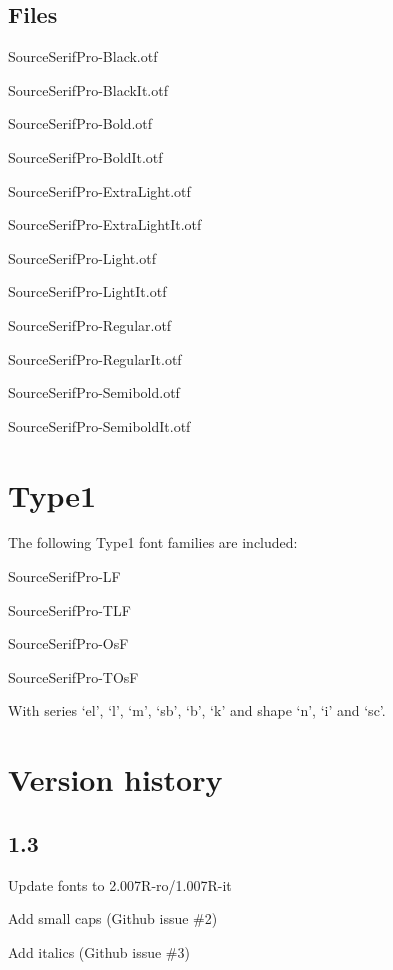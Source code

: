 \documentclass[10pt,a4paper,english]{article}
\begin{document}
\begin{multicols}{2}
\subsection{Files}
\begin{itemize*}
	\item SourceSerifPro-Black.otf
	\item SourceSerifPro-BlackIt.otf
	\item SourceSerifPro-Bold.otf
	\item SourceSerifPro-BoldIt.otf
	\item SourceSerifPro-ExtraLight.otf
	\item SourceSerifPro-ExtraLightIt.otf
	\item SourceSerifPro-Light.otf
	\item SourceSerifPro-LightIt.otf
	\item SourceSerifPro-Regular.otf
	\item SourceSerifPro-RegularIt.otf
	\item SourceSerifPro-Semibold.otf
	\item SourceSerifPro-SemiboldIt.otf
\end{itemize*}

\section{Type1}
The following Type1 font families are included:
\begin{itemize*}
	\item SourceSerifPro-LF
	\item SourceSerifPro-TLF
	\item SourceSerifPro-OsF
	\item SourceSerifPro-TOsF
\end{itemize*}
With series ‘el’, ‘l’, ‘m’, ‘sb’, ‘b’, ‘k’ and shape ‘n’, ‘i’ and ‘sc’.

\section{Version history}
\subsection*{1.3}
\begin{itemize*}
	\item Update fonts to 2.007R-ro/1.007R-it
	\item Add small caps (Github issue \#2)
	\item Add italics (Github issue \#3)
\end{itemize*}


\end{multicols}
\end{document}
